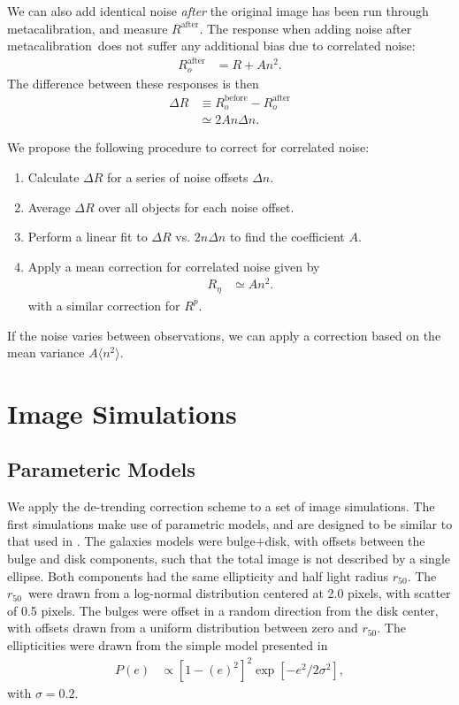 \documentclass[usegraphicx,usenatbib]{mn2e}
\newcommand{\hlr}{$r_{50}$}
\newcommand{\mcal}{metacalibration}
\newcommand{\mcalRpsf}{$R^{p}$}
\newcommand{\mcalRnoise}{$R_\eta$}
\begin{document}
We can also add identical noise {\em after} the original image  has been run
through \mcal, and measure $R^{\mathrm{after}}$.  The response when adding
noise after \mcal\ does not suffer any additional bias due to correlated noise:
\begin{align}
    R_o^{\mathrm{after}} &= R + A n^2.
\end{align}
The difference between these responses is then 
\begin{align}
    \Delta R &\equiv R_o^{\mathrm{before}} - R_o^{\mathrm{after}}  \nonumber \\
             &\simeq 2 A n \Delta n.
\end{align}

We propose the following procedure to correct for correlated noise:
\begin{enumerate}
    \item Calculate $\Delta R$ for a series of noise offsets $\Delta n$.
    \item Average $\Delta R$ over all objects for each noise offset.
    \item Perform a linear fit to $\Delta R$ vs. $2 n \Delta n$ to find the 
        coefficient $A$.
    \item Apply a mean correction for correlated noise given by
        \begin{align}
            \mbox{\mcalRnoise} & \simeq A n^2.
        \end{align}
        with a similar correction for \mcalRpsf.
\end{enumerate}
If the noise varies between observations, we can apply a 
correction based on the mean variance $A
\langle n^2 \rangle$.


\section{Image Simulations} \label{sec:sims}

\subsection{Parameteric Models}

We apply the de-trending correction scheme to a set of image simulations.  The
first simulations make use of parametric models, and are designed to be similar
to that used in \citet{bfd2015}.  The galaxies models were bulge+disk, with
offsets between the bulge and disk components, such that the total image
is not described by a single ellipse.  Both
components had the same ellipticity and half light radius \hlr. The \hlr\ were
drawn from a log-normal distribution centered at 2.0 pixels, with scatter of
0.5 pixels.  The bulges were offset in a random direction from the disk center, with
offsets drawn from a uniform distribution between zero and \hlr.  The
ellipticities were drawn from the simple model presented in \cite{ba14}
\begin{align}
    P(e) &\propto \left[1-(e)^2\right]^2 \exp\left[-e^2/2\sigma^2\right],
\end{align}
with $\sigma=0.2$.
\end{document}
